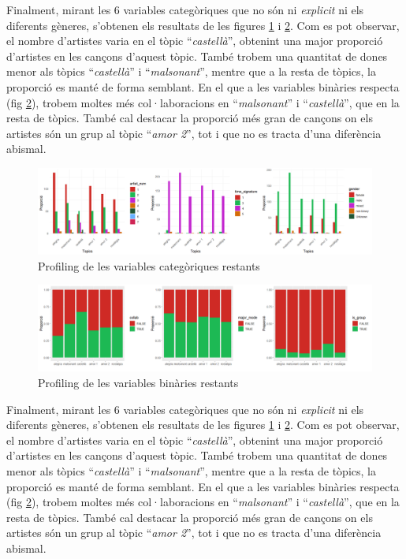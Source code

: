 Finalment, mirant les 6 variables categòriques que no són ni \textit{explicit} ni els diferents gèneres, s'obtenen els resultats de les figures \ref{fig:LDA:cat2_profiling} i \ref{fig:LDA:bin2_profiling}. Com es pot observar, el nombre d'artistes varia en el tòpic ``\textit{castellà}'', obtenint una major proporció d'artistes en les cançons d'aquest tòpic. També trobem una quantitat de dones menor als tòpics ``\textit{castellà}'' i ``\textit{malsonant}'', mentre que a la resta de tòpics, la proporció es manté de forma semblant. En el que a les variables binàries respecta (fig \ref{fig:LDA:bin2_profiling}), trobem moltes més col·laboracions en ``\textit{malsonant}'' i ``\textit{castellà}'', que en la resta de tòpics. També cal destacar la proporció més gran de cançons on els artistes són un grup al tòpic ``\textit{amor 2}'', tot i que no es tracta d'una diferència abismal.

\begin{figure}[H]
    \centering
    \includegraphics[width=0.95\linewidth]{Images/8_Textual/LDA/profiling_cats_2.png}
    \caption{Profiling de les variables categòriques restants}
    \label{fig:LDA:cat2_profiling}
\end{figure}

\begin{figure}[H]
    \centering
    \includegraphics[width=0.95\linewidth]{Images/8_Textual/LDA/profiling_bins_2.png}
    \caption{Profiling de les variables binàries restants}
    \label{fig:LDA:bin2_profiling}
\end{figure}

Finalment, mirant les 6 variables categòriques que no són ni \textit{explicit} ni els diferents gèneres, s'obtenen els resultats de les figures \ref{fig:LDA:cat2_profiling} i \ref{fig:LDA:bin2_profiling}. Com es pot observar, el nombre d'artistes varia en el tòpic ``\textit{castellà}'', obtenint una major proporció d'artistes en les cançons d'aquest tòpic. També trobem una quantitat de dones menor als tòpics ``\textit{castellà}'' i ``\textit{malsonant}'', mentre que a la resta de tòpics, la proporció es manté de forma semblant. En el que a les variables binàries respecta (fig \ref{fig:LDA:bin2_profiling}), trobem moltes més col·laboracions en ``\textit{malsonant}'' i ``\textit{castellà}'', que en la resta de tòpics. També cal destacar la proporció més gran de cançons on els artistes són un grup al tòpic ``\textit{amor 2}'', tot i que no es tracta d'una diferència abismal.

